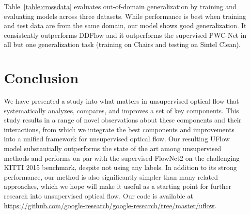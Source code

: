 \documentclass[runningheads]{llncs}
\begin{document}
Table~\ref{table:crossdata} evaluates out-of-domain generalization by training and evaluating models across three datasets. While performance is best when training and test data are from the same domain, our model shows good generalization. It consistently outperforms DDFlow and it outperforms the supervised PWC-Net in all but one generalization task (training on Chairs and testing on Sintel Clean).

\section{Conclusion}

We have presented a study into what matters in unsupervised optical flow that systematically analyzes, compares, and improves a set of key components. This study results in a range of novel observations about these components and their interactions, from which we integrate the best components and improvements into a unified framework for unsupervised optical flow. Our resulting UFlow model
substantially outperforms the state of the art among unsupervised methods and performs on par with the supervised FlowNet2 on the challenging KITTI 2015 benchmark, despite not using any labels. In addition to its strong performance, our method is also significantly simpler than many related approaches, which we hope will make it useful as a starting point for further research into unsupervised optical flow. Our code is available at \url{https://github.com/google-research/google-research/tree/master/uflow}.
	
\clearpage

{\small


}
\end{document}
